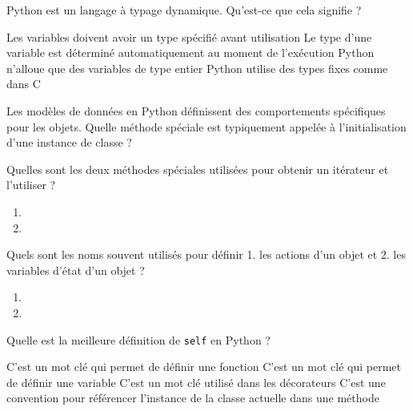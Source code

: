 \documentclass[french,a4paper,addpoints,11pt]{exam}
\begin{document}
\begin{questions}
    \clearpage
    \question

    Python est un langage à typage dynamique. Qu'est-ce que cela signifie ?

    \begin{checkboxes}
        \choice Les variables doivent avoir un type spécifié avant utilisation
        \CorrectChoice Le type d'une variable est déterminé automatiquement au moment de l'exécution
        \choice Python n'alloue que des variables de type entier
        \choice Python utilise des types fixes comme dans C
    \end{checkboxes}

    \question

    Les modèles de données en Python définissent des comportements spécifiques pour les objets. Quelle méthode spéciale est typiquement appelée à l'initialisation d'une instance de classe ?

    \fillwithlines{1cm}

    \question

    Quelles sont les deux méthodes spéciales utilisées pour obtenir un itérateur et l'utiliser ?

    \begin{enumerate}
        \item {}
        \item {}
    \end{enumerate}

    \question

    Quels sont les noms souvent utilisés pour définir 1. les actions d'un objet et 2. les variables d'état d'un objet ?

    \begin{enumerate}
        \item \fillin[méthodes]
        \item \fillin[attributs]
    \end{enumerate}

    \question

    Quelle est la meilleure définition de \lstinline|self| en Python ?

    \begin{checkboxes}
        \choice C'est un mot clé qui permet de définir une fonction
        \choice C'est un mot clé qui permet de définir une variable
        \choice C'est un mot clé utilisé dans les décorateurs
        \CorrectChoice C'est une convention pour référencer l'instance de la classe actuelle dans une méthode
    \end{checkboxes}


\end{questions}
\end{document}
